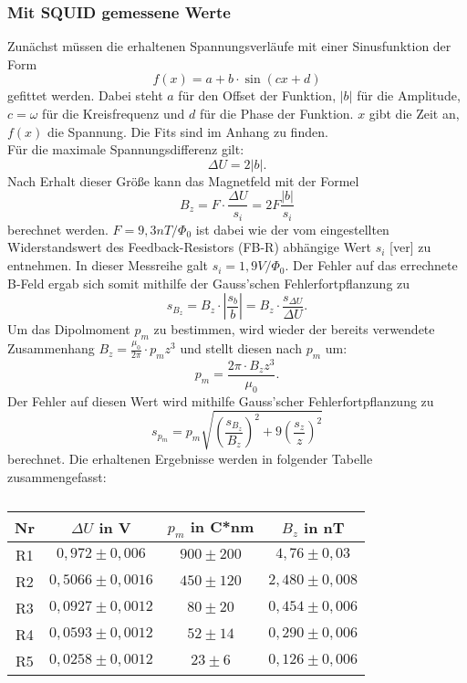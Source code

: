 \subsubsection{Mit SQUID gemessene Werte}
Zunächst müssen die erhaltenen Spannungsverläufe mit einer Sinusfunktion der Form 
\[f(x)=a+b\cdot\sin(cx+d)\]
gefittet werden. Dabei steht $a$ für den Offset der Funktion, $\left|b\right|$ für die Amplitude, $c=\omega$ für die Kreisfrequenz und $d$ für die Phase der Funktion. $x$ gibt die Zeit an, $f(x)$ die Spannung. Die Fits sind im Anhang zu finden. \\
Für die maximale Spannungsdifferenz gilt: 
\[\Delta U=2\left|b\right|.\]
Nach Erhalt dieser Größe kann das Magnetfeld mit der Formel 
\[B_{z}=F\cdot\frac{\Delta U}{s_{i}}=2F\frac{\left|b\right|}{s_{i}}\]
berechnet werden. $F=9,3 nT/\Phi_{0}$ ist dabei wie der vom eingestellten Widerstandswert des Feedback-Resistors (FB-R) abhängige Wert $s_{i}$ [ver] zu entnehmen. In dieser Messreihe galt $s_{i}=1,9 V/\Phi_{0}$. Der Fehler auf das errechnete B-Feld ergab sich somit mithilfe der Gauss'schen Fehlerfortpflanzung zu 
\[s_{B_{z}}=B_{z}\cdot\left|\frac{s_{b}}{b}\right|=B_{z}\cdot\frac{s_{\Delta U}}{\Delta U}.\]
Um das Dipolmoment $p_{m}$ zu bestimmen, wird wieder der bereits verwendete Zusammenhang $B_{z}=\frac{\mu_{0}}{2\pi}\cdot{p_{m}}{z^{3}}$ und stellt diesen nach $p_{m}$ um:
\[p_{m}=\frac{2\pi\cdot B_{z}z^{3}}{\mu_{0}}.\]
Der Fehler auf diesen Wert wird mithilfe Gauss'scher Fehlerfortpflanzung zu 
\[s_{p_{m}}=p_{m}\sqrt{\left(\frac{s_{B_{z}}}{B_{z}}\right)^{2}+9\left(\frac{s_{z}}{z}\right)^{2}}\]
berechnet. Die erhaltenen Ergebnisse werden in folgender Tabelle zusammengefasst:
\begin{table}[h]
\caption{}
\begin{center}
\begin{tabular}{|c|c|c|c|}
\hline
Nr & $\Delta U$ in V & $p_{m}$ in C*nm & $B_{z}$ in nT \\ \hline 
R1 & $0,972\pm0,006$ & $900\pm200$ & $4,76\pm0,03$ \\ 
R2 & $0,5066\pm0,0016$ & $450\pm120$ & $2,480\pm0,008$ \\ 
R3 & $0,0927\pm0,0012$ & $80\pm20$ & $0,454\pm0,006$ \\ 
R4 & $0,0593\pm0,0012$ & $52\pm14$ & $0,290\pm0,006$ \\ 
R5 & $0,0258\pm0,0012$ & $23\pm6$ & $0,126\pm0,006$ \\ \hline
\end{tabular}
\end{center}
\label{}
\end{table}
\clearpage
